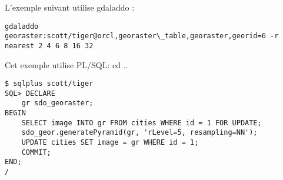 L'exemple suivant utilise gdaladdo :
\begin{verbatim}
gdaladdo georaster:scott/tiger@orcl,georaster\_table,georaster,georid=6 -r 
nearest 2 4 6 8 16 32
\end{verbatim}

Cet exemple utilise PL/SQL: 
cd ..
\begin{verbatim}
$ sqlplus scott/tiger
SQL> DECLARE
    gr sdo_georaster;
BEGIN
    SELECT image INTO gr FROM cities WHERE id = 1 FOR UPDATE;
    sdo_geor.generatePyramid(gr, 'rLevel=5, resampling=NN');
    UPDATE cities SET image = gr WHERE id = 1;
    COMMIT;
END;
/
\end{verbatim}
